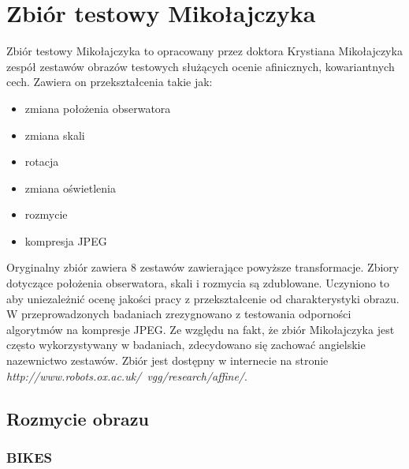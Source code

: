 \chapter{Zbiór testowy Mikołajczyka}
Zbiór testowy Mikołajczyka to opracowany przez doktora Krystiana Mikołajczyka zespół zestawów obrazów testowych służących ocenie afinicznych, kowariantnych cech. Zawiera on przekształcenia takie jak:
\begin{itemize}
\item zmiana położenia obserwatora
\item zmiana skali 
\item rotacja
\item zmiana oświetlenia
\item rozmycie
\item kompresja JPEG
\end{itemize}
Oryginalny zbiór zawiera 8 zestawów zawierające powyższe transformacje. Zbiory dotyczące położenia obserwatora, skali i rozmycia są zdublowane. Uczyniono to aby uniezależnić ocenę jakości pracy z  przekształcenie od charakterystyki obrazu. W przeprowadzonych badaniach zrezygnowano z testowania odporności algorytmów na kompresje JPEG. Ze względu na fakt, że zbiór Mikołajczyka jest często wykorzystywany w badaniach, zdecydowano się zachować angielskie nazewnictwo zestawów. Zbiór jest dostępny w internecie na stronie \textit{http://www.robots.ox.ac.uk/~vgg/research/affine/}.
\FloatBarrier
\newpage
\section{Rozmycie obrazu}
\FloatBarrier
\subsection{BIKES}

